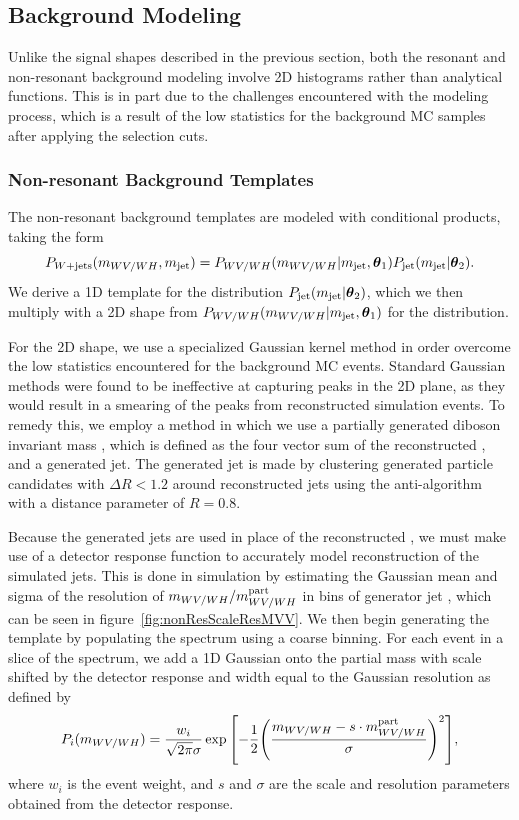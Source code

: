 \clearpage

\subsection{Background Modeling}
\label{sec:bkg}

Unlike the signal shapes described in the previous section, both the resonant and non-resonant background modeling involve 2D histograms rather than analytical functions.
This is in part due to the challenges encountered with the modeling process, which is a result of the low statistics for the background MC samples after applying the selection cuts.

\subsubsection{Non-resonant Background Templates}

The non-resonant background templates are modeled with conditional products, taking the form
\begin{equation}
  P_{W+\text{jets}}(m_{WV/WH},m_\mathrm{jet})=P_{WV/WH}(m_{WV/WH}|m_\mathrm{jet},\vb*{\theta}_1)P_\mathrm{jet}(m_\mathrm{jet}|\vb*{\theta}_2).
\end{equation}
We derive a 1D template for the \MJ distribution $P_\mathrm{jet}(m_\mathrm{jet}|\vb*{\theta}_2)$, which we then multiply with a 2D shape from $P_{WV/WH}(m_{WV/WH}|m_\mathrm{jet},\vb*{\theta}_1)$ for the \MVV distribution.

For the 2D \MVV shape, we use a specialized Gaussian kernel method in order overcome the low statistics encountered for the background MC events.
Standard Gaussian methods were found to be ineffective at capturing peaks in the 2D plane, as they would result in a smearing of the peaks from reconstructed simulation events.
To remedy this, we employ a method in which we use a partially generated diboson invariant mass \MVVpart, which is defined as the four vector sum of the reconstructed \Wlep, and a generated jet.
The generated jet is made by clustering generated particle candidates with $\Delta R<1.2$ around reconstructed jets using the anti-\kt algorithm with a distance parameter of $R=0.8$.

Because the generated jets are used in place of the reconstructed \Vhad, we must make use of a detector response function to accurately model reconstruction of the simulated jets.
This is done in simulation by estimating the Gaussian mean and sigma of the resolution of $m_{WV/WH}/m_{WV/WH}^\mathrm{part}$ in bins of generator jet \pt, which can be seen in figure~\ref{fig:nonResScaleResMVV}.
We then begin generating the template by populating the \MJ spectrum using a coarse binning.
For each event in a slice of the \MJ spectrum, we add a 1D Gaussian onto the partial mass with scale shifted by the detector response and width equal to the Gaussian resolution as defined by
\begin{equation}\label{eq:Pplus}
  P_i(\MVV)=\frac{w_i}{\sqrt{2\pi}\sigma}\exp\bqty{-\frac{1}{2}\pqty{\frac{\MVV-s\cdot\MVVpart}{\sigma}}^2},
\end{equation}
where $w_i$ is the event weight, and $s$ and $\sigma$ are the scale and resolution parameters obtained from the detector response.

